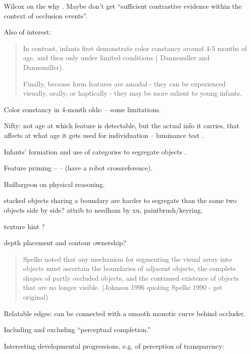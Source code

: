 Wilcox on the why \cite{wilcox99object}.  Maybe don't get
``sufficient contrastive evidence within the context of
occlusion events''.


Also of interest:

\begin{quote}

In contrast, infants first demonstrate color constancy around 4-5
months of age, and then only under limited conditions ( Dannemiller
and Dannemiller).

Finally, because form features are amodal - they can be
experienced visually, orally, or haptically - they may be more
salient to young infants.

\end{quote}

Color constancy in 4-month olds: \cite{dannemiller87test} -- some 
limitations.

Nifty: not age at which feature is detectable, but the actual
info it carries, that affects at what age it gets used for
individuation -- luminance test \cite{woods05infants}.

Infants' formation and use of categories to segregate objects 
\cite{needham05infants}.

Feature priming -- \cite{wilcox04priming}
--
(have a robot crossreference).

Baillargeon on physical reasoning.




stacked objects sharing a boundary are harder
to segregate than the same two objects
side by side?  attrib to needham by xu,
paintbrush/keyring.


texture hint \cite{johnson96perception}?

depth placement and contour ownership?

\begin{quote}

Spelke noted that any mechanism for segmenting the visual array
into objects must ascertain the boundaries of adjacent objects,
the complete shapes of partly occluded objects, and the continued
existence of objects that are no longer visible.
(Johnson 1996 quoting Spelke 1990 - get original)

\end{quote}

Relatable edges: can be connected with a smooth monotic
curve behind occluder.

Including and excluding ``perceptual completion.''

Interesting developmental progressions, e.g. of perception
of transparency: \cite{johnson00infants}


